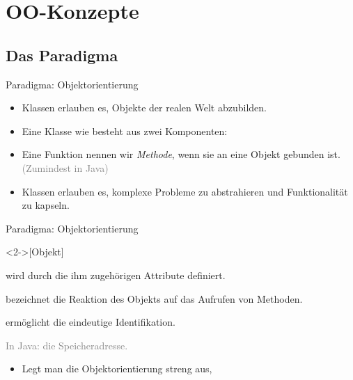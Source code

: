 
\section{OO-Konzepte}

\subsection{Das Paradigma}
\begin{frame}{Paradigma: Objektorientierung}
    \begin{itemize}[<+(1)->]
        \widei
        \item Klassen erlauben es, Objekte der realen Welt abzubilden.
        \item Eine Klasse wie  besteht aus zwei Komponenten: 
        \item Eine Funktion nennen wir \emph{Methode}, wenn sie an eine Objekt gebunden ist. \textcolor{gray}{(Zumindest in Java)}
        \item Klassen erlauben es, komplexe Probleme zu abstrahieren und Funktionalität zu kapseln.
    \end{itemize}
\end{frame}

\begin{frame}{Paradigma: Objektorientierung}
    \begin{definition}<2->[Objekt]
         \begin{description}
            \item<4->[Objektzustand] wird durch die ihm zugehörigen Attribute definiert.
            \item<5->[Objektverhalten] bezeichnet die Reaktion des Objekts auf das Aufrufen von Methoden.
            \item<6->[Objektidentität] ermöglicht die eindeutige Identifikation.\par
            \textcolor{gray}{In Java: die Speicheradresse.}
        \end{description}
    \end{definition}
    \begin{itemize}
        \item<7-> Legt man die Objektorientierung streng aus, 
    \end{itemize}
\end{frame}

